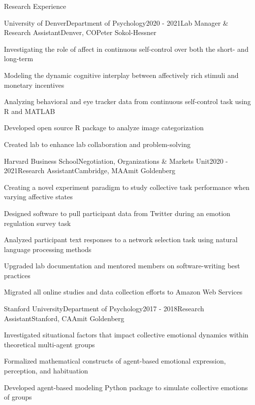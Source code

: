 \documentclass{cv} %
\begin{document}
\begin{cvSection}{Research Experience}

\begin{cvSubsectionResearch}{University of Denver}{Department of Psychology}{2020 - 2021}{Lab Manager \& Research Assistant}{Denver, CO}{Peter Sokol-Hessner}
\item Investigating the role of affect in continuous self-control over both the short- and long-term
\item Modeling the dynamic cognitive interplay between affectively rich stimuli and monetary incentives
\item Analyzing behavioral and eye tracker data from continuous self-control task using R and MATLAB
\item Developed open source R package  to analyze image categorization
\item Created lab  to enhance lab collaboration and problem-solving
\end{cvSubsectionResearch}



\begin{cvSubsectionResearch}
{Harvard Business School}{Negotiation, Organizations \& Markets Unit}{2020 - 2021}{Research Assistant}{Cambridge, MA}{Amit Goldenberg}
\item Creating a novel experiment paradigm to study collective task performance when varying affective states
\item Designed software to pull participant data from Twitter during an emotion regulation survey task
\item Analyzed participant text responses to a network selection task using natural language processing methods
\item Upgraded lab documentation and mentored members on software-writing best practices
\item Migrated all online studies and data collection efforts to Amazon Web Services
\end{cvSubsectionResearch}


\begin{cvSubsectionResearch}{Stanford University}{Department of Psychology}{2017 - 2018}{Research Assistant}{Stanford, CA}{Amit Goldenberg}
\item Investigated situational factors that impact collective emotional dynamics within theoretical multi-agent groups
\item Formalized mathematical constructs of agent-based emotional expression, perception, and habituation
\item Developed agent-based modeling Python package  to simulate collective emotions of groups
\end{cvSubsectionResearch}


\end{cvSection}
\end{document}
